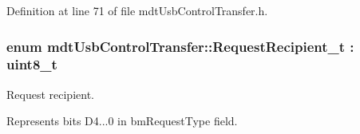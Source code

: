 Definition at line 71 of file mdt\-Usb\-Control\-Transfer.\-h.

\hypertarget{classmdt_usb_control_transfer_a372afc0db22a4ec839bab18cfbed35c5}{
\subsubsection[{Request\-Recipient\-\_\-t}]{\setlength{\rightskip}{0pt plus 5cm}enum {\bf mdt\-Usb\-Control\-Transfer\-::\-Request\-Recipient\-\_\-t} \-: uint8\-\_\-t\hspace{0.3cm}{\ttfamily [strong]}}}\label{classmdt_usb_control_transfer_a372afc0db22a4ec839bab18cfbed35c5}


Request recipient. 

Represents bits D4...0 in bm\-Request\-Type field.

